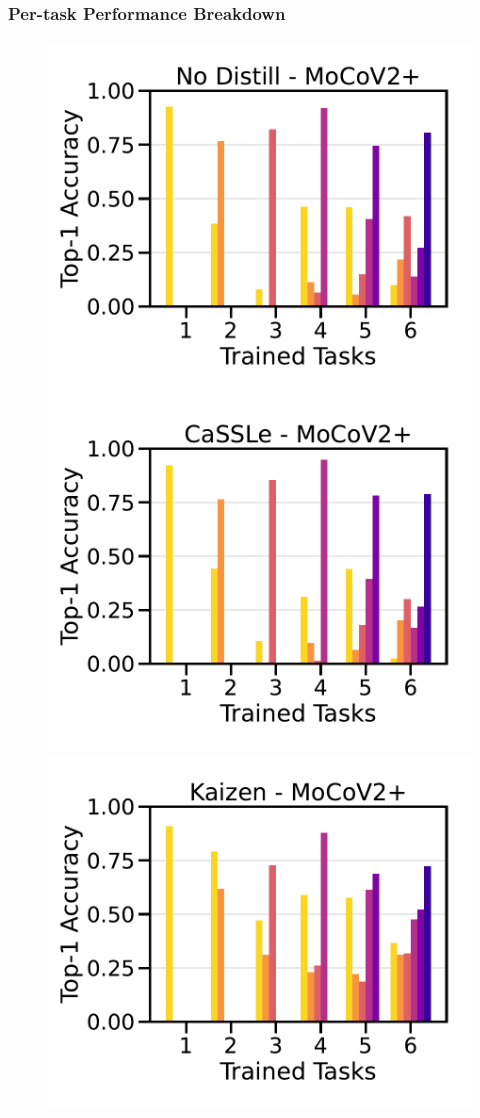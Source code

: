 \subsubsection{Per-task Performance Breakdown} \label{subsection:per_task} 
\begin{figure}[t]
    \centering
    \includegraphics[width=0.32 \linewidth ]{figures_new/Part_1/F4-WISDM2019-NoDistill-MoCoV2+-6Tasks-v2.pdf}
    \includegraphics[width=0.32 \linewidth ]{figures_new/Part_1/F4-WISDM2019-CaSSLe-MoCoV2+-6Tasks-v2.pdf}
    \includegraphics[width=0.32 \linewidth ]{figures_new/Part_1/F4-WISDM2019-Ours-MoCoV2+-6Tasks-v2.pdf} \\
    \vspace{-0.05in}
    

\end{figure}
